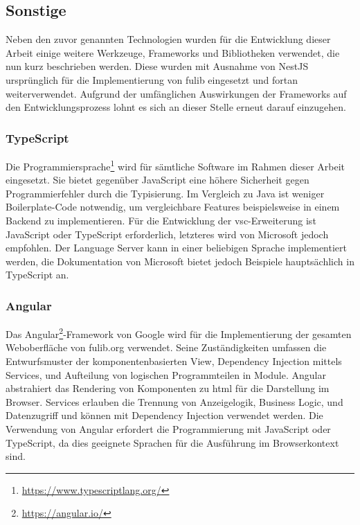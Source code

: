 \subsection{Sonstige}\label{subsec:other-libraries}

Neben den zuvor genannten Technologien wurden für die Entwicklung dieser Arbeit einige weitere Werkzeuge, Frameworks und Bibliotheken verwendet, die nun kurz beschrieben werden.
Diese wurden mit Ausnahme von NestJS ursprünglich für die Implementierung von fulib eingesetzt und fortan weiterverwendet.
Aufgrund der umfänglichen Auswirkungen der Frameworks auf den Entwicklungsprozess lohnt es sich an dieser Stelle erneut darauf einzugehen.

\subsubsection{TypeScript}
Die Programmiersprache\footnote{\url{https://www.typescriptlang.org/}} wird für sämtliche Software im Rahmen dieser Arbeit eingesetzt.
Sie bietet gegenüber JavaScript eine höhere Sicherheit gegen Programmierfehler durch die Typisierung.
Im Vergleich zu Java ist weniger Boilerplate-Code notwendig, um vergleichbare Features beispielsweise in einem Backend zu implementieren.
Für die Entwicklung der \ac{vsc}-Erweiterung ist JavaScript oder TypeScript erforderlich, letzteres wird von Microsoft jedoch empfohlen.\cite{vsc-first-extension}
Der Language Server kann in einer beliebigen Sprache implementiert werden, die Dokumentation von Microsoft bietet jedoch Beispiele hauptsächlich in TypeScript an.\cite{vsc-language-server-guide}

\subsubsection{Angular}
Das Angular\footnote{\url{https://angular.io/}}-Framework von Google wird für die Implementierung der gesamten Weboberfläche von fulib.org verwendet.
Seine Zuständigkeiten umfassen die Entwurfsmuster der komponentenbasierten View, Dependency Injection mittels Services, und Aufteilung von logischen Programmteilen in Module.
Angular abstrahiert das Rendering von Komponenten zu \ac{html} für die Darstellung im Browser.
Services erlauben die Trennung von Anzeigelogik, Business Logic, und Datenzugriff und können mit Dependency Injection verwendet werden.
Die Verwendung von Angular erfordert die Programmierung mit JavaScript oder TypeScript, da dies geeignete Sprachen für die Ausführung im Browserkontext sind.

